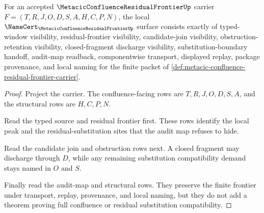 \begin{theorem}
\label{thm:metacic-confluence-residual-frontier-namecert-obligations}
For an accepted $\MetacicConfluenceResidualFrontierUp$ carrier $F=(T,R,J,O,D,S,A,H,C,P,N)$, the local $\NameCert_{\MetacicConfluenceResidualFrontierUp}$ surface consists exactly of typed-window visibility, residual-frontier visibility, candidate-join visibility, obstruction-retention visibility, closed-fragment discharge visibility, substitution-boundary handoff, audit-map readback, componentwise transport, displayed replay, package provenance, and local naming for the finite packet of \autoref{def:metacic-confluence-residual-frontier-carrier}.
\end{theorem}
\begin{proof}
Project the carrier. The confluence-facing rows are $T,R,J,O,D,S,A$, and the structural rows are $H,C,P,N$.

Read the typed source and residual frontier first. These rows identify the local peak and the residual-substitution sites that the audit map refuses to hide.

Read the candidate join and obstruction rows next. A closed fragment may discharge through $D$, while any remaining substitution compatibility demand stays named in $O$ and $S$.

Finally read the audit-map and structural rows. They preserve the finite frontier under transport, replay, provenance, and local naming, but they do not add a theorem proving full confluence or residual substitution compatibility.
\end{proof}

